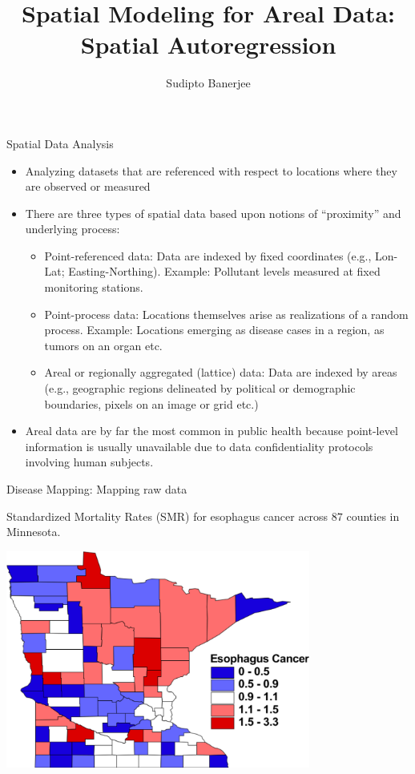 \documentclass[10pt]{beamer}
\title[BIOSTAT~241] 
{%
Spatial Modeling for Areal Data: Spatial Autoregression
}
\author[Sudipto Banerjee]
{
 Sudipto Banerjee
}
\institute[UCLA]
{
  University of California, Los Angeles, USA
}
\date[]{}
\begin{document}
\begin{frame}
 \titlepage
\end{frame}

\begin{frame}{Spatial Data Analysis}

\begin{itemize}\setlength{\itemsep}{0.3cm}
\item Analyzing datasets that are referenced with respect to locations where they are observed or measured

\item There are three types of spatial data based upon notions of ``proximity'' and underlying process:
	\begin{itemize}\setlength{\itemsep}{0.3cm}
	\item Point-referenced data: Data are indexed by fixed coordinates (e.g., Lon-Lat; Easting-Northing). Example: Pollutant levels measured at fixed monitoring stations.  
	\item Point-process data: Locations themselves arise as realizations of a random process. Example: Locations emerging as disease cases in a region, as tumors on an organ etc. 
	\item Areal or regionally aggregated (lattice) data: Data are indexed by areas (e.g., geographic regions delineated by political or demographic boundaries, pixels on an image or grid etc.)   
	\end{itemize}

\item Areal data are by far the most common in public health because point-level information is usually unavailable due to data confidentiality protocols involving human subjects.	
	
\end{itemize}

\end{frame}

\begin{frame}{Disease Mapping: Mapping raw data}

Standardized Mortality Rates (SMR) for esophagus cancer across $87$ counties in Minnesota.

\begin{center}
\includegraphics[width=0.75\textwidth, height=0.75\textheight]{figs/esophraw.pdf}
\end{center}

\end{frame}
\end{document}
